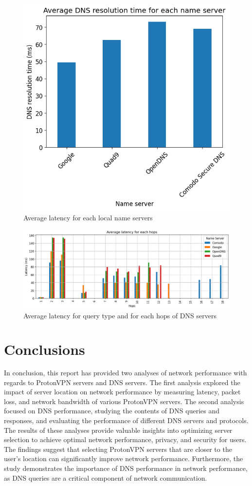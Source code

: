 \documentclass[eng]{class}
\begin{document}
\begin{figure}[H]
    \centering
    \includegraphics[width=.7\columnwidth]{images/avgLat2.3.png}
    \caption{Average latency for each local name servers}
    \label{fig-8}
\end{figure}

\begin{figure}[H]
    \centering
    \includegraphics[width=\columnwidth]{images/avglathops2.3.png}
    \caption{Average latency for query type and for each hops of DNS servers}
    \label{fig-9}
\end{figure}
\section{Conclusions}
In conclusion, this report has provided two analyses of network performance with regards to ProtonVPN servers and DNS servers.
The first analysis explored the impact of server location on network performance by measuring latency, packet loss, and network bandwidth of various ProtonVPN servers.
The second analysis focused on DNS performance, studying the contents of DNS queries and responses, and evaluating the performance of different DNS servers and protocols.
The results of these analyses provide valuable insights into optimizing server selection to achieve optimal network performance, privacy, and security for users.
The findings suggest that selecting ProtonVPN servers that are closer to the user's location can significantly improve network performance.
Furthermore, the study demonstrates the importance of DNS performance in network performance, as DNS queries are a critical component of network communication.
\end{document}
